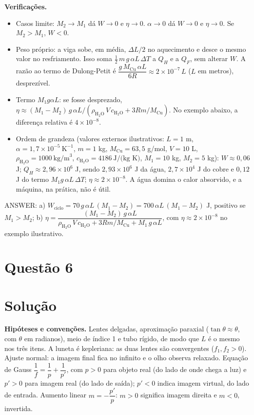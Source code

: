 \documentclass{article}%
\begin{document}
\textbf{Verificações.}
\begin{itemize}
\item Casos limite: $M_2\to M_1$ dá $W\to 0$ e $\eta\to 0$. $\alpha\to 0$ dá $W\to 0$ e $\eta\to 0$. Se $M_2>M_1$, $W<0$.
\item Peso próprio: a viga sobe, em média, $\Delta L/2$ no aquecimento e desce o mesmo valor no resfriamento. Isso soma $\tfrac{1}{2}\,m\,g\,\alpha L\,\Delta T$ a $Q_H$ e a $Q_F$, sem alterar $W$. A razão ao termo de Dulong-Petit é $\dfrac{g\,M_{\text{Cu}}\,\alpha L}{6R}\approx 2\times 10^{-7}\,L$ ($L$ em metros), desprezível.
\item Termo $M_1 g\alpha L$: se fosse desprezado, $\eta\approx(M_1-M_2)\,g\,\alpha L/(\rho_{\text{H}_2\text{O}}\,V\,c_{\text{H}_2\text{O}}+3Rm/M_{\text{Cu}})$. No exemplo abaixo, a diferença relativa é $4\times 10^{-8}$.
\item Ordem de grandeza (valores externos ilustrativos: $L=1$ m, $\alpha=1{,}7\times 10^{-5}\ \text{K}^{-1}$, $m=1$ kg, $M_{\text{Cu}}=63{,}5$ g/mol, $V=10$ L, $\rho_{\text{H}_2\text{O}}=1000\ \text{kg/m}^3$, $c_{\text{H}_2\text{O}}=4186\ \text{J/(kg K)}$, $M_1=10$ kg, $M_2=5$ kg): $W\approx 0{,}06$ J; $Q_H\approx 2{,}96\times 10^{6}$ J, sendo $2{,}93\times 10^{6}$ J da água, $2{,}7\times 10^{4}$ J do cobre e $0{,}12$ J do termo $M_1 g\,\alpha L\,\Delta T$; $\eta\approx 2\times 10^{-8}$. A água domina o calor absorvido, e a máquina, na prática, não é útil.
\end{itemize}

ANSWER: a) $W_{\text{ciclo}}=70\,g\,\alpha L\,(M_1-M_2)=700\,\alpha L\,(M_1-M_2)$ J, positivo se $M_1>M_2$; b) $\eta=\dfrac{(M_1-M_2)\,g\,\alpha L}{\rho_{\text{H}_2\text{O}}\,V\,c_{\text{H}_2\text{O}}+3Rm/M_{\text{Cu}}+M_1\,g\,\alpha L}$, com $\eta\approx 2\times 10^{-8}$ no exemplo ilustrativo.%
\newpage%
\section*{Questão 6}

\section*{Solução}

\textbf{Hipóteses e convenções.} Lentes delgadas, aproximação paraxial ($\tan\theta\approx\theta$, com $\theta$ em radianos), meio de índice 1 e tubo rígido, de modo que $L$ é o mesmo nos três itens. A luneta é kepleriana: as duas lentes são convergentes ($f_1,f_2>0$). Ajuste normal: a imagem final fica no infinito e o olho observa relaxado. Equação de Gauss $\dfrac{1}{f}=\dfrac{1}{p}+\dfrac{1}{p'}$, com $p>0$ para objeto real (do lado de onde chega a luz) e $p'>0$ para imagem real (do lado de saída); $p'<0$ indica imagem virtual, do lado de entrada. Aumento linear $m=-\dfrac{p'}{p}$: $m>0$ significa imagem direita e $m<0$, invertida.
\end{document}

